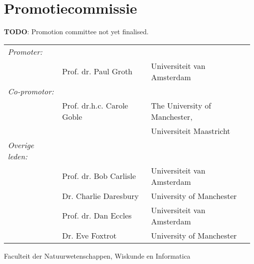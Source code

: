 \newpage

\section*{Promotiecommissie}

\textbf{TODO}: Promotion committee not yet finalised.

\begin{tabular}{lll}
\textit{Promoter:}  &  & \\
     & Prof. dr. Paul Groth     & Universiteit van Amsterdam \\
\textit{Co-promotor:} & & \\     
     &  Prof. dr.h.c. Carole Goble & The University of Manchester, \\
     &                          & Universiteit Maastricht \\
\textit{Overige leden:} & & \\
     &  Prof.   dr. Bob Carlisle   & Universiteit van Amsterdam \\
     &  Dr. Charlie Daresbury   & University of Manchester  \\     
     &  Prof. dr. Dan Eccles     & Universiteit van Amsterdam \\
     &  Dr. Eve Foxtrot         & University of Manchester  \\     
\end{tabular}

Faculteit der Natuurwetenschappen, Wiskunde en Informatica
